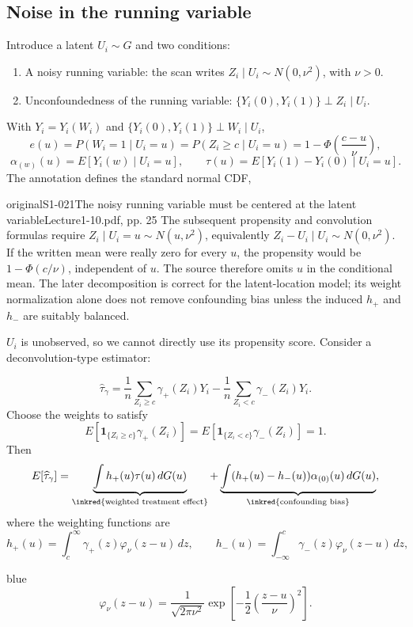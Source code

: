 \subsection{Noise in the running variable}
 Introduce a latent $U_i\sim G$ and two conditions:
\begin{enumerate}
\item A noisy running variable: the scan writes $Z_i\mid U_i\sim N(0,\nu^2)$, with $\nu>0$.
\item Unconfoundedness of the running variable: $\{Y_i(0),Y_i(1)\}\perp Z_i\mid U_i$.
\end{enumerate}
With $Y_i=Y_i(W_i)$ and $\{Y_i(0),Y_i(1)\}\perp W_i\mid U_i$,
\[
e(u)=P(W_i=1\mid U_i=u)=P(Z_i\geq c\mid U_i=u)
=1-\Phi\left(\frac{c-u}{\nu}\right),
\]
\[
\alpha_{(w)}(u)=E[Y_i(w)\mid U_i=u],\qquad
\tau(u)=E[Y_i(1)-Y_i(0)\mid U_i=u].
\]
The annotation defines the standard normal CDF,
\begin{reviewnote}{original}{S1-021}{The noisy running variable must be centered at the latent variable}{Lecture1-10.pdf, pp. 25}
The subsequent propensity and convolution formulas require $Z_i\mid U_i=u\sim N(u,\nu^2)$, equivalently $Z_i-U_i\mid U_i\sim N(0,\nu^2)$. If the written mean were really zero for every $u$, the propensity would be $1-\Phi(c/\nu)$, independent of $u$. The source therefore omits $u$ in the conditional mean. The later decomposition is correct for the latent-location model; its weight normalization alone does not remove confounding bias unless the induced $h_+$ and $h_-$ are suitably balanced.
\end{reviewnote}


$U_i$ is unobserved, so we cannot directly use its propensity score. Consider a deconvolution-type estimator:

\[
\widehat\tau_\gamma=\frac1n\sum_{Z_i\geq c}\gamma_+(Z_i)Y_i
-\frac1n\sum_{Z_i<c}\gamma_-(Z_i)Y_i.
\]
Choose the weights to satisfy
\[
E[\mathbf1_{\{Z_i\geq c\}}\gamma_+(Z_i)]
=E[\mathbf1_{\{Z_i<c\}}\gamma_-(Z_i)]=1.
\]
Then
\[
E[\widehat\tau_\gamma]
=\underbrace{\int h_+(u)\tau(u)\,dG(u)}_{\text{\inkred{weighted treatment effect}}}
+\underbrace{\int(h_+(u)-h_-(u))\alpha_{(0)}(u)\,dG(u)}_{\text{\inkred{confounding bias}}},
\]
where the weighting functions are
\[
h_+(u)=\int_c^\infty\gamma_+(z)\varphi_\nu(z-u)\,dz,\qquad
h_-(u)=\int_{-\infty}^c\gamma_-(z)\varphi_\nu(z-u)\,dz,
\]
\begin{inkblock}{blue}
\[
\varphi_\nu(z-u)=\frac1{\sqrt{2\pi\nu^2}}\exp\left[-\frac12\left(\frac{z-u}{\nu}\right)^2\right].
\]
\end{inkblock}

